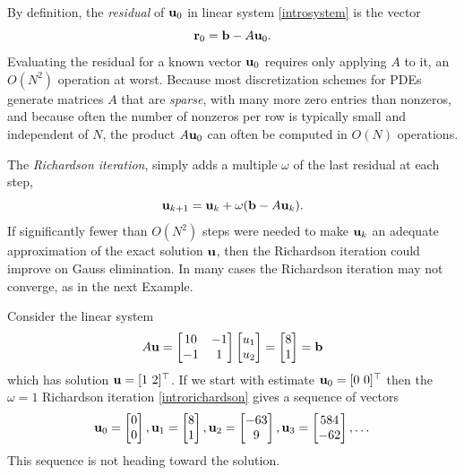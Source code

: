 By definition, the \emph{residual} of $\mathbf{u}_0$ in linear system \eqref{introsystem} is the vector
\begin{equation}
\mathbf{r}_0 = \mathbf{b} - A \mathbf{u}_0. \label{residualdefn}
\end{equation}
Evaluating the residual for a known vector $\mathbf{u}_0$ requires only applying $A$ to it, an $O(N^2)$ operation at worst.  Because most discretization schemes for PDEs generate matrices $A$ that are \emph{sparse}, with many more zero entries than nonzeros, and because often the number of nonzeros per row is typically small and independent of $N$, the product $A\mathbf{u}_0$ can often be computed in $O(N)$ operations.

The \emph{Richardson iteration}, simply adds a multiple $\omega$ of the last residual at each step,
\begin{equation}
\mathbf{u}_{k+1} = \mathbf{u}_k + \omega (\mathbf{b} - A \mathbf{u}_k).  \label{introrichardson}
\end{equation}
If significantly fewer than $O(N^2)$ steps were needed to make $\mathbf{u}_k$ an adequate approximation of the exact solution $\mathbf{u}$, then the Richardson iteration could improve on Gauss elimination.  In many cases the Richardson iteration may not converge, as in the next Example.

\medskip\noindent\hrulefill
\begin{example} Consider the linear system
\begin{equation}
A \mathbf{u}
= \begin{bmatrix}
10 & -1 \\ -1 & 1
\end{bmatrix}
\begin{bmatrix} u_1 \\ u_2 \end{bmatrix}
= \begin{bmatrix} 8 \\ 1 \end{bmatrix}
= \mathbf{b}
 \label{introexample}
\end{equation}
which has solution $\mathbf{u} = [1\,\, 2]^\top$.  If we start with estimate $\mathbf{u}_0 = [0\,\, 0]^\top$ then the $\omega=1$ Richardson iteration \eqref{introrichardson} gives a sequence of vectors %
\begin{equation}
{\mathbf{u}}_{0} = \begin{bmatrix} 0 \\ 0 \end{bmatrix}, {\mathbf{u}}_{1} = \begin{bmatrix} 8 \\ 1 \end{bmatrix}, {\mathbf{u}}_{2} = \begin{bmatrix} -63 \\ 9 \end{bmatrix}, {\mathbf{u}}_{3} = \begin{bmatrix} 584 \\ -62 \end{bmatrix}, \dots
\end{equation}
This sequence is not heading toward the solution.
\end{example}
\noindent\hrulefill

